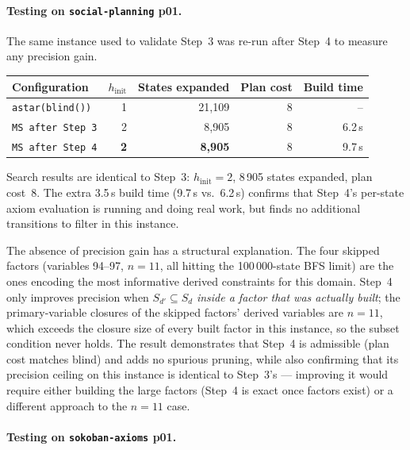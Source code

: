 \documentclass[11pt,a4paper]{article}
\begin{document}
\begin{itemize}
    \paragraph{Testing on \texttt{social-planning} p01.}

    The same instance used to validate Step~3 was re-run after Step~4 to
    measure any precision gain.

    \begin{center}
    \begin{tabular}{lrrrr}
    \toprule
    \textbf{Configuration} & \textbf{$h_{\mathrm{init}}$}
      & \textbf{States expanded} & \textbf{Plan cost} & \textbf{Build time} \\
    \midrule
    \texttt{astar(blind())}                     & 1 & 21{,}109 & 8 & -- \\
    \texttt{MS after Step~3} & 2 & 8{,}905  & 8 & 6.2\,s \\
    \texttt{MS after Step~4} & \textbf{2} & \textbf{8{,}905}  & 8 & 9.7\,s \\
    \bottomrule
    \end{tabular}
    \end{center}

    Search results are identical to Step~3: $h_{\mathrm{init}} = 2$, 8\,905
    states expanded, plan cost~8.  The extra 3.5\,s build time (9.7\,s
    vs.\ 6.2\,s) confirms that Step~4's per-state axiom evaluation is
    running and doing real work, but finds no additional transitions to
    filter in this instance.

    The absence of precision gain has a structural explanation.  The four
    skipped factors (variables 94--97, $n = 11$, all hitting the 100\,000-state
    BFS limit) are the ones encoding the most informative derived constraints
    for this domain.  Step~4 only improves precision when $S_{d'} \subseteq
    S_d$ \emph{inside a factor that was actually built}; the primary-variable
    closures of the skipped factors' derived variables are $n = 11$, which
    exceeds the closure size of every built factor in this instance, so the
    subset condition never holds.  The result demonstrates that Step~4 is
    admissible (plan cost matches blind) and adds no spurious pruning, while
    also confirming that its precision ceiling on this instance is identical
    to Step~3's --- improving it would require either building the large
    factors (Step~4 is exact once factors exist) or a different approach to
    the $n = 11$ case.

    \paragraph{Testing on \texttt{sokoban-axioms} p01.}


\end{itemize}
\end{document}

